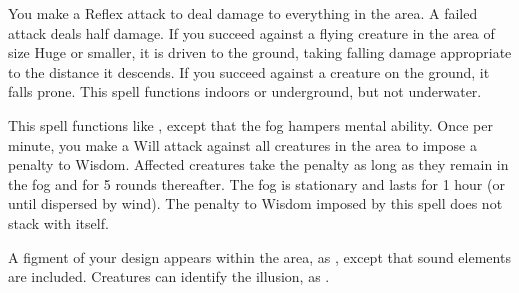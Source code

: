 \spelleffect You make a Reflex attack to deal damage to everything in the area. A failed attack deals half damage. If you succeed against a flying creature in the area of size Huge or smaller, it is driven to the ground, taking falling damage appropriate to the distance it descends. If you succeed against a creature on the ground, it falls prone.
\spellnotes This spell functions indoors or underground, but not underwater.

\spelleffect This spell functions like , except that the fog hampers mental ability. Once per minute, you make a Will attack against all creatures in the area to impose a  penalty to Wisdom. Affected creatures take the penalty as long as they remain in the fog and for 5 rounds thereafter. The fog is stationary and lasts for 1 hour (or until dispersed by wind).
\spellnotes The penalty to Wisdom imposed by this spell does not stack with itself. \fogspellnotes

\spelldur{\durshort}
\spellline
\spelleffect A figment of your design appears within the area, as , except that sound elements are included.
\spellnotes Creatures can identify the illusion, as .

